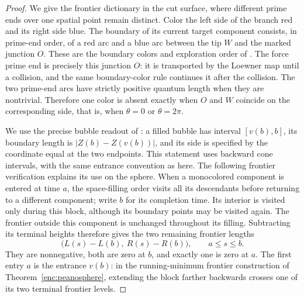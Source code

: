 \documentclass[11pt]{article}
\numberwithin{equation}{section}
\theoremstyle{definition}
\theoremstyle{remark}
\newcommand{\1}{\mathbf 1}
\begin{document}
\begin{proof}
We give the frontier dictionary in the cut surface, where different
prime ends over one spatial point remain distinct.  Color the left
side of the branch red and its right side blue.  The boundary of its
current target component consists, in prime-end order, of a red arc
and a blue arc between the tip $W$ and the marked junction $O$.
These are the boundary colors and exploration order of
\cite[Section~2.1.7 and Figure~9]{AruHoldenPowellSunCritical}.
The force prime end is precisely this junction $O$: it is transported
by the Loewner map until a collision, and the same boundary-color rule
continues it after the collision.  The two prime-end arcs have strictly
positive quantum length when they are nontrivial.  Therefore one color
is absent exactly when $O$ and $W$ coincide on the corresponding side,
that is, when $\theta=0$ or $\theta=2\pi$.

We use the precise bubble readout of
\cite[Section~2.3.4, Definition~2.2 and Figure~4; Lemma~3.1]
{GwynneMillerSLECharacterization}: a filled bubble has interval
$[v(b),b]$, its boundary length is $|Z(b)-Z(v(b))|$, and its side
is specified by the coordinate equal at the two endpoints.  This
statement uses backward cone intervals, with the same entrance
convention as here.  The following frontier verification explains
its use on the sphere.  When a
monocolored component is entered at time $a$, the space-filling order
visits all its descendants before returning to a different component;
write $b$ for its completion time.  Its interior is visited only during
this block, although its boundary points may be visited again.
The frontier outside this component
is unchanged throughout its filling.  Subtracting its terminal heights
therefore gives the two remaining frontier lengths
\begin{equation}\label{loop:frontier-lengths}
 \bigl(L(s)-L(b),\ R(s)-R(b)\bigr),\qquad a\le s\le b.
\end{equation}
They are nonnegative, both are zero at $b$, and exactly one is zero
at $a$.  The first entry $a$ is the entrance $v(b)$: in the
running-minimum frontier construction of
Theorem~\ref{enc:peanosphere}, extending the block farther backwards
crosses one of its two terminal frontier levels.


\end{proof}
\end{document}
